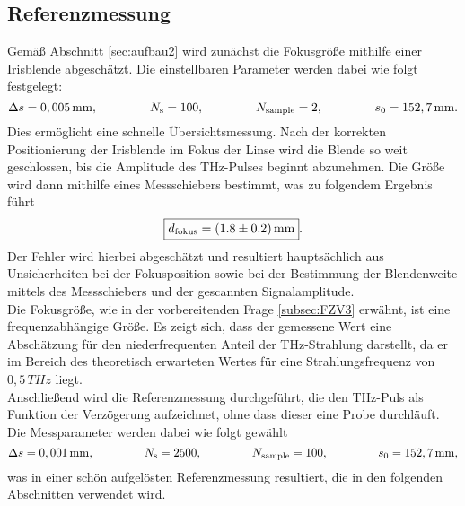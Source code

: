 \subsection{\label{sec:A21}Referenzmessung}
Gemäß Abschnitt \ref{sec:aufbau2} wird zunächst die Fokusgröße mithilfe einer Irisblende abgeschätzt. 
Die einstellbaren Parameter werden dabei wie folgt festgelegt:
\begin{equation}
    \Delta s = 0,005\,\si{mm}, \hspace{1.5cm} N_{\text{s}} = 100, \hspace{1.5cm} N_{\text{sample}} = 2, \hspace{1.5cm} s_{0} = 152,7\,\si{mm}. 
\end{equation}
Dies ermöglicht eine schnelle Übersichtsmessung. 
Nach der korrekten Positionierung der Irisblende im Fokus der Linse wird die Blende 
so weit geschlossen, bis die Amplitude des THz-Pulses beginnt abzunehmen. 
Die Größe wird dann mithilfe eines Messschiebers bestimmt, was zu folgendem Ergebnis führt
\begin{equation}
    \fbox{$d_{\text{fokus}} = (1.8 \pm 0.2)\,\si{mm}$}.
\end{equation}
Der Fehler wird hierbei abgeschätzt und resultiert hauptsächlich 
aus Unsicherheiten bei der Fokusposition sowie bei der Bestimmung der Blendenweite 
mittels des Messschiebers und der gescannten Signalamplitude. \\
Die Fokusgröße, wie in der vorbereitenden Frage \ref{subsec:FZV3} erwähnt, 
ist eine frequenzabhängige Größe. 
Es zeigt sich, dass der gemessene Wert eine Abschätzung für den niederfrequenten
Anteil der THz-Strahlung darstellt, da er im Bereich des theoretisch erwarteten Wertes 
für eine Strahlungsfrequenz von $0,5\,\si{THz}$ liegt. \\
Anschließend wird die Referenzmessung durchgeführt, die den THz-Puls als Funktion 
der Verzögerung aufzeichnet, ohne dass dieser eine Probe durchläuft. 
Die Messparameter werden dabei wie folgt gewählt
\begin{equation}
    \Delta s = 0,001\,\si{mm}, \hspace{1.5cm} N_{\text{s}} = 2500, \hspace{1.5cm} N_{\text{sample}} = 100, \hspace{1.5cm} s_{0} = 152,7\,\si{mm}, 
\end{equation}
was in einer schön aufgelösten Referenzmessung resultiert, die in den folgenden 
Abschnitten verwendet wird. \\